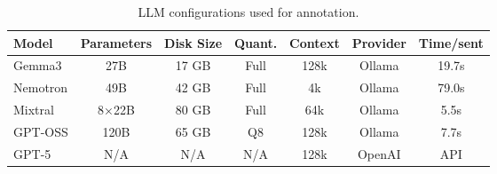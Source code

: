 \begin{table}[h!]
\centering
\caption{LLM configurations used for annotation.}
\label{tab:llm_configs}
\begin{tabular}{lcccccc}
\toprule
\textbf{Model} & \textbf{Parameters} & \textbf{Disk Size} & \textbf{Quant.} & \textbf{Context} & \textbf{Provider} & \textbf{Time/sent} \\
\midrule
Gemma3 & 27B & 17 GB & Full & 128k & Ollama & 19.7s \\
Nemotron & 49B & 42 GB & Full & 4k & Ollama & 79.0s \\
Mixtral & 8×22B & 80 GB & Full & 64k & Ollama & 5.5s \\
GPT-OSS & 120B & 65 GB & Q8 & 128k & Ollama & 7.7s \\
GPT-5 & N/A & N/A & N/A & 128k & OpenAI & API \\
\bottomrule
\end{tabular}
\end{table}